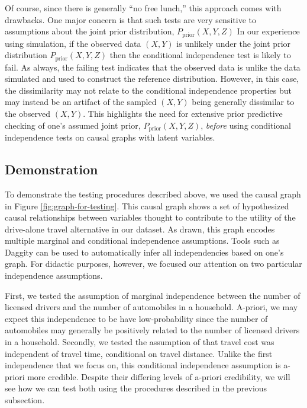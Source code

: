 Of course, since there is generally ``no free lunch,'' this approach comes with drawbacks.
One major concern is that such tests are very sensitive to assumptions about the joint prior distribution, $P_{\textrm{prior}} \left( X, Y, Z \right)$
In our experience using simulation, if the observed data $\left( X, Y \right)$ is unlikely under the joint prior distribution $P_{\textrm{prior}} \left( X, Y, Z \right)$ then the conditional independence test is likely to fail.
As always, the failing test indicates that the observed data is unlike the data simulated and used to construct the reference distribution.
However, in this case, the dissimilarity may not relate to the conditional independence properties but may instead be an artifact of the sampled $\left( X, Y \right)$ being generally dissimilar to the observed $\left( X, Y \right)$.
This highlights the need for extensive prior predictive checking of one's assumed joint prior, $P_{\textrm{prior}} \left( X, Y, Z \right)$, \textit{before} using conditional independence tests on causal graphs with latent variables.

\subsection{Demonstration}
\label{sec:testing-demonstration}

To demonstrate the testing procedures described above, we used the causal graph in Figure \ref{fig:graph-for-testing}.
This causal graph shows a set of hypothesized causal relationships between variables thought to contribute to the utility of the drive-alone travel alternative in our dataset.
As drawn, this graph encodes multiple marginal and conditional independence assumptions.
Tools such as Daggity \citep{textor_2016_robust} can be used to automatically infer all independencies based on one's graph.
For didactic purposes, however, we focused our attention on two particular independence assumptions.

First, we tested the assumption of marginal independence between the number of licensed drivers and the number of automobiles in a household.
A-priori, we may expect this independence to be have low-probability since the number of automobiles may generally be positively related to the number of licensed drivers in a household.
Secondly, we tested the assumption of that travel cost was independent of travel time, conditional on travel distance.
Unlike the first independence that we focus on, this conditional independence assumption is a-priori more credible.
Despite their differing levels of a-priori credibility, we will see how we can test both using the procedures described in the previous subsection.

